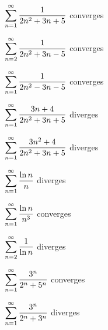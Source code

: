 \exercise $\displaystyle\sum_{n=1}^\infty {1\over 2n^2+3n+5} $
\answer converges
\endanswer
\endexercise

\exercise $\displaystyle\sum_{n=2}^\infty {1\over 2n^2+3n-5} $
\answer  converges
\endanswer
\endexercise

\exercise $\displaystyle\sum_{n=1}^\infty {1\over 2n^2-3n-5} $
\answer  converges
\endanswer
\endexercise

\exercise $\displaystyle\sum_{n=1}^\infty {3n+4\over 2n^2+3n+5} $
\answer diverges
\endanswer
\endexercise

\exercise $\displaystyle\sum_{n=1}^\infty {3n^2+4\over 2n^2+3n+5} $
\answer diverges
\endanswer
\endexercise

\exercise $\displaystyle\sum_{n=1}^\infty {\ln n\over n}$
\answer diverges
\endanswer
\endexercise

\exercise $\displaystyle\sum_{n=1}^\infty {\ln n\over n^3}$
\answer converges
\endanswer
\endexercise

\exercise $\displaystyle\sum_{n=2}^\infty {1\over \ln n}$
\answer diverges
\endanswer
\endexercise

\exercise $\displaystyle\sum_{n=1}^\infty {3^n\over 2^n+5^n}$
\answer converges
\endanswer
\endexercise

\exercise $\displaystyle\sum_{n=1}^\infty {3^n\over 2^n+3^n}$
\answer diverges
\endanswer

\endtwocol
\endexercise

\endexercises

